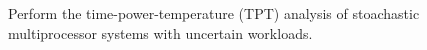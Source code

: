Perform the time-power-temperature (TPT) analysis of stoachastic multiprocessor systems with uncertain workloads.
